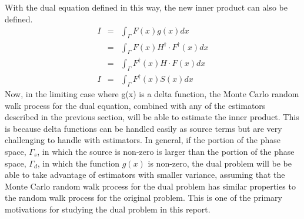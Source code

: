 With the dual equation defined in this way, the new inner product can also
be defined.
\begin{eqnarray}
  I & = & \int_{\Gamma} F(x)g(x)dx \nonumber \\
  & = & \int_{\Gamma} F(x) H^{\dagger} \cdot F^{\dagger}(x)dx \nonumber \\
  & = & \int_{\Gamma}  F^{\dagger}(x) H \cdot F(x) dx \nonumber \\
  I & = & \int_{\Gamma} F^{\dagger}(x)S(x) dx
\end{eqnarray}
Now, in the limiting case where g(x) is a delta function, the Monte Carlo
random walk process for the dual equation, combined with any of the estimators 
described in the previous section, will be able to estimate the inner product. 
This is because delta functions can be handled easily as source terms but
are very challenging to handle with estimators. In general, if the portion of 
the phase space, $\Gamma_s$, in which the source is non-zero is larger than the
portion of the phase space, $\Gamma_d$, in which the function $g(x)$ is 
non-zero, the dual problem will be be able to take advantage of estimators with
smaller variance, assuming that the Monte Carlo random walk process for the
dual problem has similar properties to the random walk process for the original
problem. This is one of the primary motivations for studying the dual problem 
in this report.
